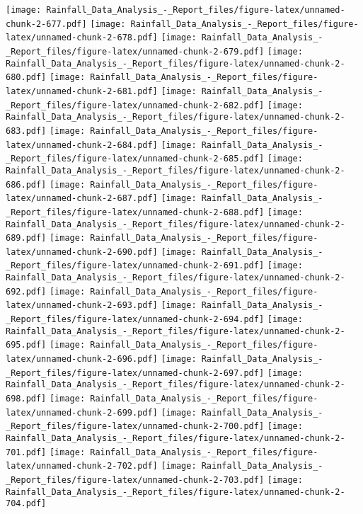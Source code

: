 \documentclass[
]{article}
\begin{document}
\texttt{[image: Rainfall\_Data\_Analysis\_-\_Report\_files/figure-latex/unnamed-chunk-2-677.pdf]}
\texttt{[image: Rainfall\_Data\_Analysis\_-\_Report\_files/figure-latex/unnamed-chunk-2-678.pdf]}
\texttt{[image: Rainfall\_Data\_Analysis\_-\_Report\_files/figure-latex/unnamed-chunk-2-679.pdf]}
\texttt{[image: Rainfall\_Data\_Analysis\_-\_Report\_files/figure-latex/unnamed-chunk-2-680.pdf]}
\texttt{[image: Rainfall\_Data\_Analysis\_-\_Report\_files/figure-latex/unnamed-chunk-2-681.pdf]}
\texttt{[image: Rainfall\_Data\_Analysis\_-\_Report\_files/figure-latex/unnamed-chunk-2-682.pdf]}
\texttt{[image: Rainfall\_Data\_Analysis\_-\_Report\_files/figure-latex/unnamed-chunk-2-683.pdf]}
\texttt{[image: Rainfall\_Data\_Analysis\_-\_Report\_files/figure-latex/unnamed-chunk-2-684.pdf]}
\texttt{[image: Rainfall\_Data\_Analysis\_-\_Report\_files/figure-latex/unnamed-chunk-2-685.pdf]}
\texttt{[image: Rainfall\_Data\_Analysis\_-\_Report\_files/figure-latex/unnamed-chunk-2-686.pdf]}
\texttt{[image: Rainfall\_Data\_Analysis\_-\_Report\_files/figure-latex/unnamed-chunk-2-687.pdf]}
\texttt{[image: Rainfall\_Data\_Analysis\_-\_Report\_files/figure-latex/unnamed-chunk-2-688.pdf]}
\texttt{[image: Rainfall\_Data\_Analysis\_-\_Report\_files/figure-latex/unnamed-chunk-2-689.pdf]}
\texttt{[image: Rainfall\_Data\_Analysis\_-\_Report\_files/figure-latex/unnamed-chunk-2-690.pdf]}
\texttt{[image: Rainfall\_Data\_Analysis\_-\_Report\_files/figure-latex/unnamed-chunk-2-691.pdf]}
\texttt{[image: Rainfall\_Data\_Analysis\_-\_Report\_files/figure-latex/unnamed-chunk-2-692.pdf]}
\texttt{[image: Rainfall\_Data\_Analysis\_-\_Report\_files/figure-latex/unnamed-chunk-2-693.pdf]}
\texttt{[image: Rainfall\_Data\_Analysis\_-\_Report\_files/figure-latex/unnamed-chunk-2-694.pdf]}
\texttt{[image: Rainfall\_Data\_Analysis\_-\_Report\_files/figure-latex/unnamed-chunk-2-695.pdf]}
\texttt{[image: Rainfall\_Data\_Analysis\_-\_Report\_files/figure-latex/unnamed-chunk-2-696.pdf]}
\texttt{[image: Rainfall\_Data\_Analysis\_-\_Report\_files/figure-latex/unnamed-chunk-2-697.pdf]}
\texttt{[image: Rainfall\_Data\_Analysis\_-\_Report\_files/figure-latex/unnamed-chunk-2-698.pdf]}
\texttt{[image: Rainfall\_Data\_Analysis\_-\_Report\_files/figure-latex/unnamed-chunk-2-699.pdf]}
\texttt{[image: Rainfall\_Data\_Analysis\_-\_Report\_files/figure-latex/unnamed-chunk-2-700.pdf]}
\texttt{[image: Rainfall\_Data\_Analysis\_-\_Report\_files/figure-latex/unnamed-chunk-2-701.pdf]}
\texttt{[image: Rainfall\_Data\_Analysis\_-\_Report\_files/figure-latex/unnamed-chunk-2-702.pdf]}
\texttt{[image: Rainfall\_Data\_Analysis\_-\_Report\_files/figure-latex/unnamed-chunk-2-703.pdf]}
\texttt{[image: Rainfall\_Data\_Analysis\_-\_Report\_files/figure-latex/unnamed-chunk-2-704.pdf]}
\end{document}
